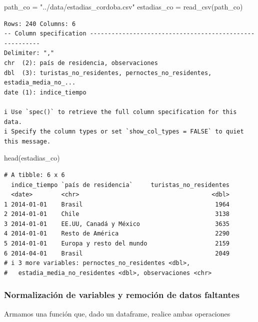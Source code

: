 \documentclass[
  spanish,
  letterpaper,
  DIV=11,
  numbers=noendperiod]{scrartcl}
\newenvironment{Shaded}{\begin{snugshade}}{\end{snugshade}}
\newcommand{\FunctionTok}[1]{\textcolor[rgb]{0.28,0.35,0.67}{#1}}
\newcommand{\NormalTok}[1]{\textcolor[rgb]{0.00,0.23,0.31}{#1}}
\newcommand{\OtherTok}[1]{\textcolor[rgb]{0.00,0.23,0.31}{#1}}
\newcommand{\StringTok}[1]{\textcolor[rgb]{0.13,0.47,0.30}{#1}}
\begin{document}
\begin{Shaded}
\begin{Highlighting}[]
\NormalTok{path\_co }\OtherTok{=} \StringTok{"../data/estadias\_cordoba.csv"}
\NormalTok{estadias\_co }\OtherTok{=} \FunctionTok{read\_csv}\NormalTok{(path\_co)}
\end{Highlighting}
\end{Shaded}

\begin{verbatim}
Rows: 240 Columns: 6
-- Column specification --------------------------------------------------------
Delimiter: ","
chr  (2): país de residencia, observaciones
dbl  (3): turistas_no_residentes, pernoctes_no_residentes, estadia_media_no_...
date (1): indice_tiempo

i Use `spec()` to retrieve the full column specification for this data.
i Specify the column types or set `show_col_types = FALSE` to quiet this message.
\end{verbatim}

\begin{Shaded}
\begin{Highlighting}[]
\FunctionTok{head}\NormalTok{(estadias\_co)}
\end{Highlighting}
\end{Shaded}

\begin{verbatim}
# A tibble: 6 x 6
  indice_tiempo `país de residencia`     turistas_no_residentes
  <date>        <chr>                                     <dbl>
1 2014-01-01    Brasil                                     1964
2 2014-01-01    Chile                                      3138
3 2014-01-01    EE.UU, Canadá y México                     3635
4 2014-01-01    Resto de América                           2290
5 2014-01-01    Europa y resto del mundo                   2159
6 2014-04-01    Brasil                                     2049
# i 3 more variables: pernoctes_no_residentes <dbl>,
#   estadia_media_no_residentes <dbl>, observaciones <chr>
\end{verbatim}

\subsubsection{Normalización de variables y remoción de datos
faltantes}\label{normalizaciuxf3n-de-variables-y-remociuxf3n-de-datos-faltantes}

Armamos una función que, dado un dataframe, realice ambas operaciones
\end{document}
